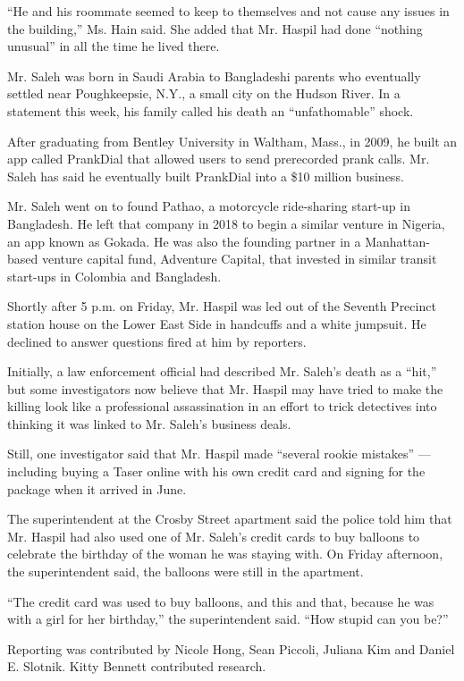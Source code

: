``He and his roommate seemed to keep to themselves and not cause any
issues in the building,'' Ms. Hain said. She added that Mr. Haspil had
done ``nothing unusual'' in all the time he lived there.

Mr. Saleh was born in Saudi Arabia to Bangladeshi parents who eventually
settled near Poughkeepsie, N.Y., a small city on the Hudson River. In a
statement this week, his family called his death an ``unfathomable''
shock.

After graduating from Bentley University in Waltham, Mass., in 2009, he
built an app called PrankDial that allowed users to send prerecorded
prank calls. Mr. Saleh has said he eventually built PrankDial into a
\$10 million business.

Mr. Saleh went on to found Pathao, a motorcycle ride-sharing start-up in
Bangladesh. He left that company in 2018 to begin a similar venture in
Nigeria, an app known as Gokada. He was also the founding partner in a
Manhattan-based venture capital fund, Adventure Capital, that invested
in similar transit start-ups in Colombia and Bangladesh.

Shortly after 5 p.m. on Friday, Mr. Haspil was led out of the Seventh
Precinct station house on the Lower East Side in handcuffs and a white
jumpsuit. He declined to answer questions fired at him by reporters.

Initially, a law enforcement official had described Mr. Saleh's death as
a ``hit,'' but some investigators now believe that Mr. Haspil may have
tried to make the killing look like a professional assassination in an
effort to trick detectives into thinking it was linked to Mr. Saleh's
business deals.

Still, one investigator said that Mr. Haspil made ``several rookie
mistakes'' --- including buying a Taser online with his own credit card
and signing for the package when it arrived in June.

The superintendent at the Crosby Street apartment said the police told
him that Mr. Haspil had also used one of Mr. Saleh's credit cards to buy
balloons to celebrate the birthday of the woman he was staying with. On
Friday afternoon, the superintendent said, the balloons were still in
the apartment.

``The credit card was used to buy balloons, and this and that, because
he was with a girl for her birthday,'' the superintendent said. ``How
stupid can you be?''

Reporting was contributed by Nicole Hong, Sean Piccoli, Juliana Kim and
Daniel E. Slotnik. Kitty Bennett contributed research.

